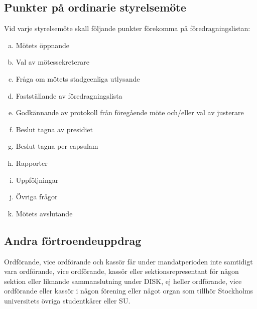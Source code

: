         \subsection{Punkter på ordinarie styrelsemöte}
        \label{subsec:punkterpaordinariestyrelsemote}
                Vid varje styrelsemöte skall följande punkter förekomma på föredragningslistan:
                \begin{enumerate}[a.]
                \setlength{\itemsep}{0.0cm}
                \setlength{\parskip}{0.0cm}
                        \item Mötets öppnande
                        \item Val av mötessekreterare
                        \item Fråga om mötets stadgeenliga utlysande
                        \item Fastställande av föredragningslista
                        \item Godkännande av protokoll från föregående möte och/eller val av justerare
                        \item Beslut tagna av presidiet
                        \item Beslut tagna per capsulam
                        \item Rapporter
                        \item Uppföljningar
                \setcounter{enumi}{24}
                        \item Övriga frågor
                        \item Mötets avslutande
                \end{enumerate}

        \subsection{Andra förtroendeuppdrag}
        \label{subsec:andrafortroendeuppdrag}
                Ordförande, vice ordförande och kassör får under mandatperioden inte samtidigt vara ordförande, vice ordförande, kassör eller sektionsrepresentant för någon sektion eller liknande sammanslutning under DISK, ej heller ordförande, vice ordförande eller kassör i någon förening eller något organ som tillhör Stockholms universitets övriga studentkårer eller SU.

